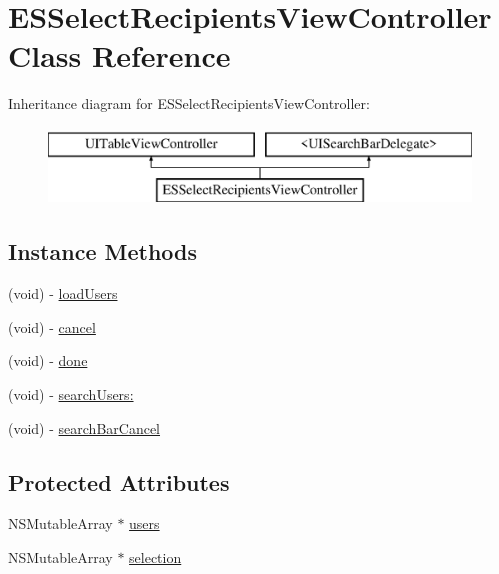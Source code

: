 \hypertarget{interface_e_s_select_recipients_view_controller}{}\section{E\+S\+Select\+Recipients\+View\+Controller Class Reference}
\label{interface_e_s_select_recipients_view_controller}
Inheritance diagram for E\+S\+Select\+Recipients\+View\+Controller\+:\begin{figure}[H]
\begin{center}
\leavevmode
\includegraphics[height=2.000000cm]{interface_e_s_select_recipients_view_controller}
\end{center}
\end{figure}
\subsection*{Instance Methods}
\begin{DoxyCompactItemize}
\item 
(void) -\/ \hyperlink{interface_e_s_select_recipients_view_controller_a1a8791b6e96e97aadd20221c104c988c}{load\+Users}
\item 
(void) -\/ \hyperlink{interface_e_s_select_recipients_view_controller_a9b8e76df588010eee773cfde94e2dab5}{cancel}
\item 
(void) -\/ \hyperlink{interface_e_s_select_recipients_view_controller_a6245a82b2e8a7815616471dfd686ff9f}{done}
\item 
(void) -\/ \hyperlink{interface_e_s_select_recipients_view_controller_a63598c5b795b3b794108214039ee54d3}{search\+Users\+:}
\item 
(void) -\/ \hyperlink{interface_e_s_select_recipients_view_controller_a6ecc6f283ff2c51f0bcec7d8da96392c}{search\+Bar\+Cancel}
\end{DoxyCompactItemize}
\subsection*{Protected Attributes}
\begin{DoxyCompactItemize}
\item 
N\+S\+Mutable\+Array $\ast$ \hyperlink{interface_e_s_select_recipients_view_controller_adc9c3f4be7ec81c847669f698817f1d6}{users}
\item 
N\+S\+Mutable\+Array $\ast$ \hyperlink{interface_e_s_select_recipients_view_controller_aad6d164467aaac5862c10ebd43f0265b}{selection}
\end{DoxyCompactItemize}
